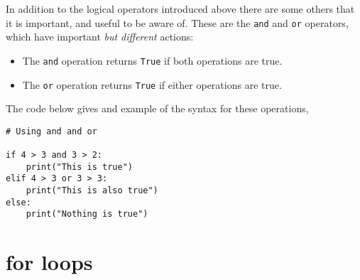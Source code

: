 \documentclass[a4paper]{article}
\begin{document}
In addition to the logical operators introduced above there are some others that it is important, and useful to be aware of. 
These are the \texttt{and} and \texttt{or} operators, which have important \emph{but different} actions:
\begin{itemize}
	\item{The \texttt{and} operation returns \texttt{True} if both operations are true.}
	\item{The \texttt{or} operation returns \texttt{True} if either operations are true.}
\end{itemize}
The code below gives and example of the syntax for these operations, 
\begin{lstlisting}
# Using and and or

if 4 > 3 and 3 > 2:
	print("This is true")
elif 4 > 3 or 3 > 3:
	print("This is also true")
else:
	print("Nothing is true")
\end{lstlisting}
\vspace{\baselineskip}
\begin{center}
	\noindent{}
\end{center}

\section{for loops}

%
%
\end{document}

